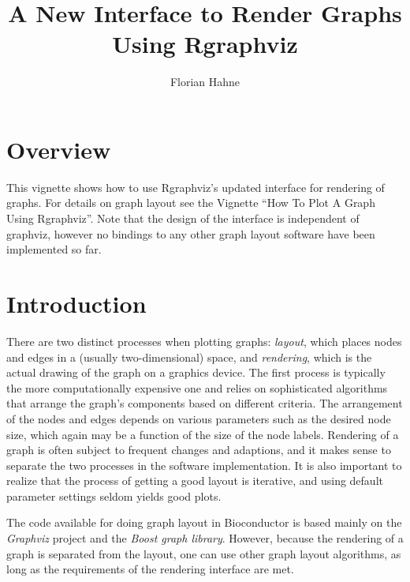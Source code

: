\documentclass{article}
\author{Florian Hahne}
\begin{document}

\title{A New Interface to Render Graphs Using Rgraphviz}
\maketitle
\tableofcontents

\section{Overview}
This vignette shows how to use Rgraphviz's updated interface for
rendering of graphs. For details on graph layout see the Vignette
``How To Plot A Graph Using Rgraphviz''. Note that the design of the
interface is independent of graphviz, however no bindings to any other
graph layout software have been implemented so far.




\section{Introduction}
There are two distinct processes when plotting graphs:
\textit{layout}, which places nodes and edges in a (usually
two-dimensional) space, and \textit{rendering}, which is the actual
drawing of the graph on a graphics device. The first process is
typically the more computationally expensive one and relies on
sophisticated algorithms that arrange the graph's components based on
different criteria. The arrangement of the nodes and edges depends on
various parameters such as the desired node size, which again may be a
function of the size of the node labels. Rendering of a graph is often
subject to frequent changes and adaptions, and it makes sense to
separate the two processes in the software implementation.  It is also
important to realize that the process of getting a good layout is
iterative, and using default parameter settings seldom yields good
plots.

The code available for doing graph layout in Bioconductor is based
mainly on the \textit{Graphviz} project and the \textit{Boost graph
  library}. However, because the rendering of a graph is separated
from the layout, one can use other graph layout algorithms, as long as
the requirements of the rendering interface are met.
\end{document}
